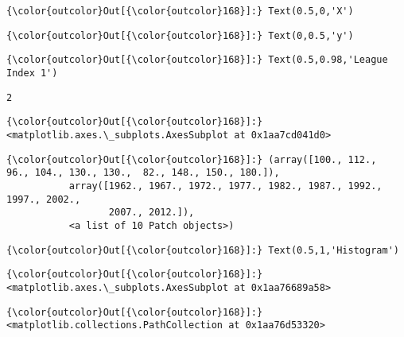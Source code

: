 \documentclass[11pt]{article}
\begin{document}
\begin{Verbatim}[commandchars=\\\{\}]
{\color{outcolor}Out[{\color{outcolor}168}]:} Text(0.5,0,'X')
\end{Verbatim}
            
\begin{Verbatim}[commandchars=\\\{\}]
{\color{outcolor}Out[{\color{outcolor}168}]:} Text(0,0.5,'y')
\end{Verbatim}
            
\begin{Verbatim}[commandchars=\\\{\}]
{\color{outcolor}Out[{\color{outcolor}168}]:} Text(0.5,0.98,'League Index 1')
\end{Verbatim}
            
    \begin{Verbatim}[commandchars=\\\{\}]
2

    \end{Verbatim}

\begin{Verbatim}[commandchars=\\\{\}]
{\color{outcolor}Out[{\color{outcolor}168}]:} <matplotlib.axes.\_subplots.AxesSubplot at 0x1aa7cd041d0>
\end{Verbatim}
            
\begin{Verbatim}[commandchars=\\\{\}]
{\color{outcolor}Out[{\color{outcolor}168}]:} (array([100., 112.,  96., 104., 130., 130.,  82., 148., 150., 180.]),
           array([1962., 1967., 1972., 1977., 1982., 1987., 1992., 1997., 2002.,
                  2007., 2012.]),
           <a list of 10 Patch objects>)
\end{Verbatim}
            
\begin{Verbatim}[commandchars=\\\{\}]
{\color{outcolor}Out[{\color{outcolor}168}]:} Text(0.5,1,'Histogram')
\end{Verbatim}
            
\begin{Verbatim}[commandchars=\\\{\}]
{\color{outcolor}Out[{\color{outcolor}168}]:} <matplotlib.axes.\_subplots.AxesSubplot at 0x1aa76689a58>
\end{Verbatim}
            
\begin{Verbatim}[commandchars=\\\{\}]
{\color{outcolor}Out[{\color{outcolor}168}]:} <matplotlib.collections.PathCollection at 0x1aa76d53320>
\end{Verbatim}
            
\end{document}
